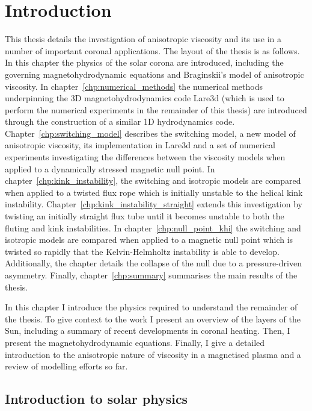 \chapter{Introduction}
\label{chp:background}

\graphicspath{{images/background/}}

This thesis details the investigation of anisotropic viscosity and its use in a number of important coronal applications. The layout of the thesis is as follows. In this chapter the physics of the solar corona are introduced, including the governing magnetohydrodynamic equations and Braginskii's model of anisotropic viscosity. In chapter~\ref{chp:numerical_methods} the numerical methods underpinning the 3D magnetohydrodynamics code Lare3d (which is used to perform the numerical experiments in the remainder of this thesis) are introduced through the construction of a similar 1D hydrodynamics code. Chapter~\ref{chp:switching_model} describes the switching model, a new model of anisotropic viscosity, its implementation in Lare3d and a set of numerical experiments investigating the differences between the viscosity models when applied to a dynamically stressed magnetic null point. In chapter~\ref{chp:kink_instability}, the switching and isotropic models are compared when applied to a twisted flux rope which is initially unstable to the helical kink instability. Chapter~\ref{chp:kink_instability_straight} extends this investigation by twisting an initially straight flux tube until it becomes unstable to both the fluting and kink instabilities. In chapter~\ref{chp:null_point_khi} the switching and isotropic models are compared when applied to a magnetic null point which is twisted so rapidly that the Kelvin-Helmholtz instability is able to develop. Additionally, the chapter details the collapse of the null due to a pressure-driven asymmetry. Finally, chapter~\ref{chp:summary} summarises the main results of the thesis.

In this chapter I introduce the physics required to understand the remainder of the thesis. To give context to the work I present an overview of the layers of the Sun, including a summary of recent developments in coronal heating. Then, I present the magnetohydrodynamic equations. Finally, I give a detailed introduction to the anisotropic nature of viscosity in a magnetised plasma and a review of modelling efforts so far.

\section{Introduction to solar physics}

